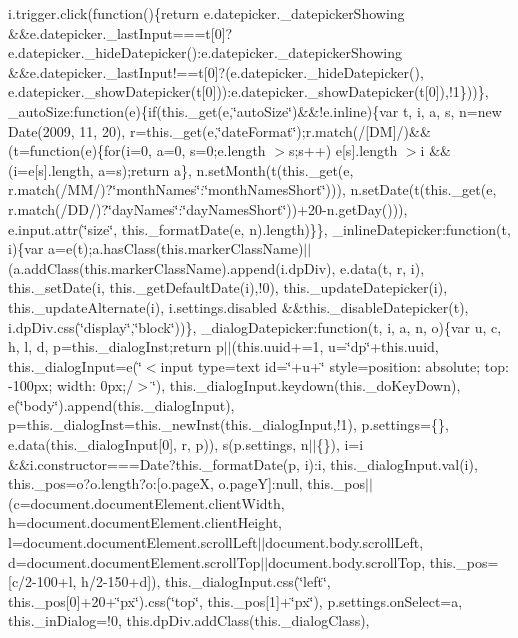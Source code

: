 {{\begin{DoxyParamCaption}
i.\+trigger.\+click(function()\{return e.\+datepicker.\+\_\+datepicker\+Showing \&\&e.\+datepicker.\+\_\+last\+Input===t\mbox{[}0\mbox{]}?e.\+datepicker.\+\_\+hide\+Datepicker()\+:e.\+datepicker.\+\_\+datepicker\+Showing \&\&e.\+datepicker.\+\_\+last\+Input!==t\mbox{[}0\mbox{]}?(e.\+datepicker.\+\_\+hide\+Datepicker(), e.\+datepicker.\+\_\+show\+Datepicker(t\mbox{[}0\mbox{]}))\+:e.\+datepicker.\+\_\+show\+Datepicker(t\mbox{[}0\mbox{]}),!1\}))\}, \+\_\+auto\+Size\+:function(e)\{if(this.\+\_\+get(e,\char`\"{}auto\+Size\char`\"{})\&\&!e.\+inline)\{var t, i, a, s, n=new Date(2009, 11, 20), r=this.\+\_\+get(e,\char`\"{}date\+Format\char`\"{});r.\+match(/\mbox{[}\+D\+M\mbox{]}/)\&\&(t=function(e)\{for(i=0, a=0, s=0;e.\+length $>$s;s++) e\mbox{[}s\mbox{]}.\+length $>$i \&\&(i=e\mbox{[}s\mbox{]}.\+length, a=s);return a\}, n.\+set\+Month(t(this.\+\_\+get(e, r.\+match(/\+M\+M/)?\char`\"{}month\+Names\char`\"{}\+:\char`\"{}month\+Names\+Short\char`\"{}))), n.\+set\+Date(t(this.\+\_\+get(e, r.\+match(/\+D\+D/)?\char`\"{}day\+Names\char`\"{}\+:\char`\"{}day\+Names\+Short\char`\"{}))+20-\/n.\+get\+Day())), e.\+input.\+attr(\char`\"{}size\char`\"{}, this.\+\_\+format\+Date(e, n).\+length)\}\}, \+\_\+inline\+Datepicker\+:function(t, i)\{var a=e(t);a.\+has\+Class(this.\+marker\+Class\+Name)$\vert$$\vert$(a.\+add\+Class(this.\+marker\+Class\+Name).\+append(i.\+dp\+Div), e.\+data(t, r, i), this.\+\_\+set\+Date(i, this.\+\_\+get\+Default\+Date(i),!0), this.\+\_\+update\+Datepicker(i), this.\+\_\+update\+Alternate(i), i.\+settings.\+disabled \&\&this.\+\_\+disable\+Datepicker(t), i.\+dp\+Div.\+css(\char`\"{}display\char`\"{},\char`\"{}block\char`\"{}))\}, \+\_\+dialog\+Datepicker\+:function(t, i, a, n, o)\{var u, c, h, l, d, p=this.\+\_\+dialog\+Inst;return p$\vert$$\vert$(this.\+uuid+=1, u=\char`\"{}dp\char`\"{}+this.\+uuid, this.\+\_\+dialog\+Input=e(\char`\"{}$<$input type=\textquotesingle{}text\textquotesingle{} id=\textquotesingle{}\char`\"{}+u+\char`\"{}\textquotesingle{} style=\textquotesingle{}position\+: absolute; top\+: -\/100px; width\+: 0px;\textquotesingle{}/$>$\char`\"{}), this.\+\_\+dialog\+Input.\+keydown(this.\+\_\+do\+Key\+Down), e(\char`\"{}body\char`\"{}).\+append(this.\+\_\+dialog\+Input), p=this.\+\_\+dialog\+Inst=this.\+\_\+new\+Inst(this.\+\_\+dialog\+Input,!1), p.\+settings=\{\}, e.\+data(this.\+\_\+dialog\+Input\mbox{[}0\mbox{]}, r, p)), s(p.\+settings, n$\vert$$\vert$\{\}), i=i \&\&i.\+constructor===\+Date?this.\+\_\+format\+Date(p, i)\+:i, this.\+\_\+dialog\+Input.\+val(i), this.\+\_\+pos=o?o.\+length?o\+:\mbox{[}o.\+page\+X, o.\+page\+Y\mbox{]}\+:null, this.\+\_\+pos$\vert$$\vert$(c=document.\+document\+Element.\+client\+Width, h=document.\+document\+Element.\+client\+Height, l=document.\+document\+Element.\+scroll\+Left$\vert$$\vert$document.\+body.\+scroll\+Left, d=document.\+document\+Element.\+scroll\+Top$\vert$$\vert$document.\+body.\+scroll\+Top, this.\+\_\+pos=\mbox{[}c/2-\/100+l, h/2-\/150+d\mbox{]}), this.\+\_\+dialog\+Input.\+css(\char`\"{}left\char`\"{}, this.\+\_\+pos\mbox{[}0\mbox{]}+20+\char`\"{}px\char`\"{}).\+css(\char`\"{}top\char`\"{}, this.\+\_\+pos\mbox{[}1\mbox{]}+\char`\"{}px\char`\"{}), p.\+settings.\+on\+Select=a, this.\+\_\+in\+Dialog=!0, this.\+dp\+Div.\+add\+Class(this.\+\_\+dialog\+Class), 
\end{DoxyParamCaption}}}
